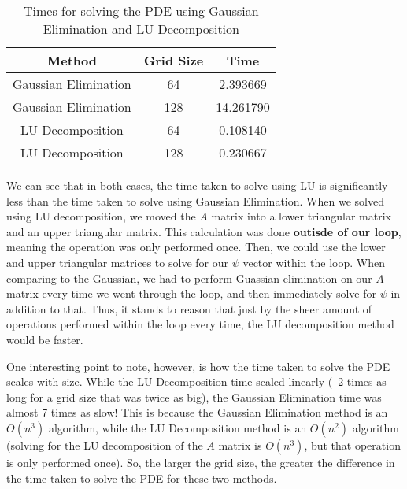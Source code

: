 \documentclass[a4paper,12pt, fleqn]{article}
\begin{document}
\begin{enumerate}
        \begin{table}[H]
            \centering
            \begin{tabular}{|c|c|c|}
                \hline
                \textbf{Method} & \textbf{Grid Size} & \textbf{Time}\\
                \hline
                Gaussian Elimination & 64 & 2.393669 \\
                Gaussian Elimination & 128 & 14.261790 \\
                LU Decomposition & 64 &  0.108140\\
                LU Decomposition & 128 & 0.230667 \\
                \hline
            \end{tabular}
            \caption{Times for solving the PDE using Gaussian Elimination and LU Decomposition}
            \label{tab:hw3-1c}
        \end{table}

        We can see that in both cases, the time taken to solve using LU is significantly 
        less than the time taken to solve using Gaussian Elimination. When we solved using 
        LU decomposition, we moved the $A$ matrix into a lower triangular matrix and an upper
        triangular matrix. This calculation was done \textbf{outisde of our loop}, meaning
        the operation was only performed once. Then, we could  use the lower and upper triangular
        matrices to solve for our $\psi$ vector within the loop. When comparing to the Gaussian, 
        we had to perform Guassian elimination on our $A$ matrix every time we went through the 
        loop, and then immediately solve for $\psi$ in addition to that. Thus, it stands to reason 
        that just by the sheer amount of operations performed within the loop every time, 
        the LU decomposition method would be faster.

        One interesting point to note, however, is how the time taken to solve the PDE scales
        with size. While the LU Decomposition time scaled linearly (~2 times as long for a 
        grid size that was twice as big), the Gaussian Elimination time was almost 7 times as 
        slow! This is because the Gaussian Elimination method is an $O(n^3)$ algorithm, while the
        LU Decomposition method is an $O(n^2)$ algorithm (solving for the LU decomposition of the 
        $A$ matrix is $O(n^3)$, but that operation is only performed once). So, the larger
        the grid size, the greater the difference in the time taken to solve the PDE for these 
        two methods. 


\end{enumerate}
\end{document}
